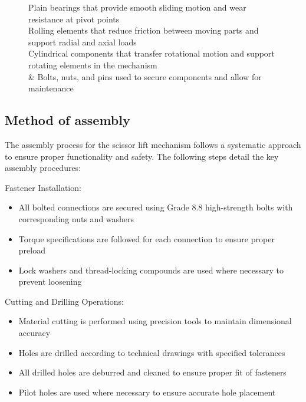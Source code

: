 \documentclass[../../main]{subfiles}
\begin{document}
\begin{figure}[h]
\begin{subfigure}[b]{0.495\textwidth}
  \caption[short]{}
  \label{e}
\end{subfigure}
\caption[Key Components of the Mechanism]{
 Plain bearings that provide smooth sliding motion and wear resistance at pivot points\\
 Rolling elements that reduce friction between moving parts and support radial and axial loads\\
 Cylindrical components that transfer rotational motion and support rotating elements in the mechanism\\
 \&  Bolts, nuts, and pins used to secure components and allow for maintenance\\
} 
\end{figure}
\newpage
\subsection{Method of assembly}\label{method-of-assembly}

The assembly process for the scissor lift mechanism follows a systematic
approach to ensure proper functionality and safety. The following steps
detail the key assembly procedures:

Fastener Installation:

\begin{itemize}
\item
  All bolted connections are secured using Grade 8.8 high-strength bolts
  with corresponding nuts and washers
\item
  Torque specifications are followed for each connection to ensure
  proper preload
\item
  Lock washers and thread-locking compounds are used where necessary to
  prevent loosening
\end{itemize}

Cutting and Drilling Operations:

\begin{itemize}
\item
  Material cutting is performed using precision tools to maintain
  dimensional accuracy
\item
  Holes are drilled according to technical drawings with specified
  tolerances
\item
  All drilled holes are deburred and cleaned to ensure proper fit of
  fasteners
\item
  Pilot holes are used where necessary to ensure accurate hole placement
\end{itemize}
\end{document}
